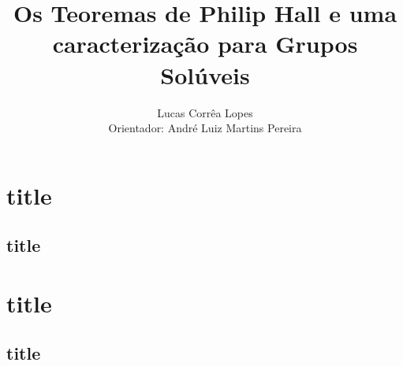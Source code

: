 \documentclass{beamer}
\title{Os Teoremas de Philip Hall e uma caracterização para Grupos Solúveis}
\author[Lucas Corrêa Lopes]{Lucas Corrêa Lopes\\ {\small Orientador: André Luiz Martins Pereira}}
\date{}
\institute{Unversidade Federal Rural do Rio de Janeiro}
\begin{document}
\section{title}
\subsection{title}
\begin{frame}
\end{frame}

\section{title}
\subsection{title}
\begin{frame}
\end{frame}
\end{document}
